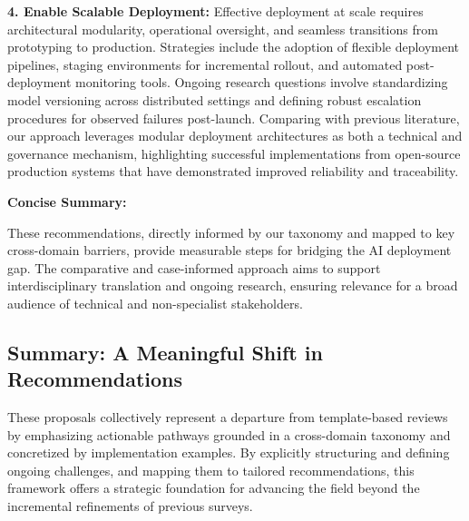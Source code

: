 \documentclass[sigconf]{acmart}
\begin{document}
\vspace{1ex}
\textbf{4. Enable Scalable Deployment:}
Effective deployment at scale requires architectural modularity, operational oversight, and seamless transitions from prototyping to production. Strategies include the adoption of flexible deployment pipelines, staging environments for incremental rollout, and automated post-deployment monitoring tools. Ongoing research questions involve standardizing model versioning across distributed settings and defining robust escalation procedures for observed failures post-launch. Comparing with previous literature, our approach leverages modular deployment architectures as both a technical and governance mechanism, highlighting successful implementations from open-source production systems that have demonstrated improved reliability and traceability.

\vspace{1.5ex}
\noindent\textbf{Concise Summary:}
\begin{center}
\end{center}

\noindent These recommendations, directly informed by our taxonomy and mapped to key cross-domain barriers, provide measurable steps for bridging the AI deployment gap. The comparative and case-informed approach aims to support interdisciplinary translation and ongoing research, ensuring relevance for a broad audience of technical and non-specialist stakeholders.

\subsection{Summary: A Meaningful Shift in Recommendations}

These proposals collectively represent a departure from template-based reviews by emphasizing actionable pathways grounded in a cross-domain taxonomy and concretized by implementation examples. By explicitly structuring and defining ongoing challenges, and mapping them to tailored recommendations, this framework offers a strategic foundation for advancing the field beyond the incremental refinements of previous surveys. 
\end{document}
